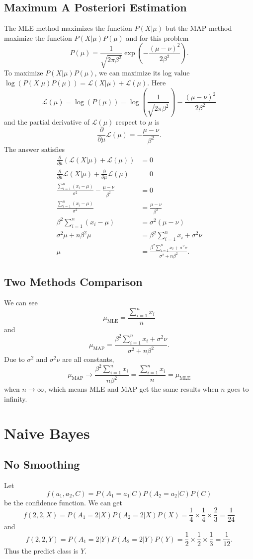 \documentclass{article}
\begin{document}
\subsection{Maximum	A Posteriori Estimation}
The MLE method maximizes the function $P(X|\mu)$ but the MAP method maximize the function $P(X|\mu)P(\mu)$ and for this problem $$P(\mu)=\frac{1}{\sqrt{2\pi\beta^2}} \exp(-\frac{(\mu-\nu)^2}{2\beta^2}).$$ To maximize $P(X|\mu)P(\mu)$, we can maximize its log value $\log(P(X|\mu)P(\mu))=\mathcal{L}(X|\mu)+\mathcal{L}(\mu)$.
Here $$\mathcal{L}(\mu)=\log(P(\mu))= \log(\frac{1}{\sqrt{2\pi\beta^2}})-\frac{(\mu-\nu)^2}{2\beta^2}$$ and the partial derivative of $\mathcal{L}(\mu)$ respect to $\mu$ is $$\frac{\partial}{\partial\mu}\mathcal{L}(\mu)= -\frac{\mu-\nu}{\beta^2}.$$ The answer satisfies
\begin{align*}
\frac{\partial}{\partial\mu} (\mathcal{L}(X|\mu)+\mathcal{L}(\mu))&=0 \\
\frac{\partial}{\partial\mu}\mathcal{L}(X|\mu)
+\frac{\partial}{\partial\mu}\mathcal{L}(\mu)&=0 \\
\frac{\sum_{i=1}^n(x_i-\mu)}{\sigma^2}-\frac{\mu-\nu}{\beta^2}&=0 \\
\frac{\sum_{i=1}^n(x_i-\mu)}{\sigma^2}&=\frac{\mu-\nu}{\beta^2} \\
\beta^2\sum_{i=1}^n(x_i-\mu)&=\sigma^2(\mu-\nu)\\
\sigma^2\mu+n\beta^2\mu&=\beta^2\sum_{i=1}^nx_i+\sigma^2\nu \\
\mu&=\frac{\beta^2\sum_{i=1}^nx_i+\sigma^2\nu}{\sigma^2+n\beta^2}.
\end{align*}

\subsection{Two Methods Comparison}
We can see $$\mu_\text{MLE}=\frac{\sum_{i=1}^nx_i}{n}$$ and $$
\mu_\text{MAP}=\frac{\beta^2\sum_{i=1}^nx_i+\sigma^2\nu} {\sigma^2+n\beta^2}.$$ Due to $\sigma^2$ and $\sigma^2\nu$ are all constants, $$\mu_\text{MAP}\rightarrow \frac{\beta^2\sum_{i=1}^nx_i}{n\beta^2}=\frac{\sum_{i=1}^nx_i}{n} =\mu_\text{MLE}$$ when $n\rightarrow\infty$, which means MLE and MAP get the same results when $n$ goes to infinity.

\section{Naive Bayes}

\subsection{No Smoothing}
Let $$f(a_1,a_2,C)=P(A_1=a_1|C)P(A_2=a_2|C)P(C)$$ be the confidence function. We can get $$f(2,2,X)=P(A_1=2|X)P(A_2=2|X)P(X)= \frac{1}{4}\times\frac{1}{4}\times\frac{2}{3}=\frac{1}{24}$$ and $$f(2,2,Y)=P(A_1=2|Y)P(A_2=2|Y)P(Y)= \frac{1}{2}\times\frac{1}{2}\times\frac{1}{3}=\frac{1}{12}.$$ Thus the predict class is $Y$.
\end{document}
